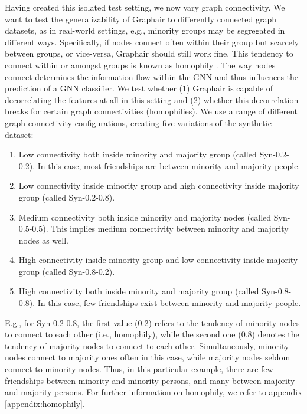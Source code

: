 Having created this isolated test setting, we now vary graph connectivity. We want to test the generalizability of Graphair to differently connected graph datasets, as in real-world settings, e.g., minority groups may be segregated in different ways.
Specifically, if nodes connect often within their group but scarcely between groups, or vice-versa, Graphair should still work fine. 
This tendency to connect within or amongst groups is known as homophily \citep{espin2022inequality}. 
The way nodes connect determines the information flow within the GNN and thus influences the prediction of a GNN classifier.
We test whether (1) Graphair is capable of decorrelating the features at all in this setting and (2) whether this decorrelation breaks for certain graph connectivities (homophilies).
We use a range of different graph connectivity configurations, creating five variations of the synthetic dataset:

\begin{enumerate}
    \item Low connectivity both inside minority and majority group (called Syn-0.2-0.2). In this case, most friendships are between minority and majority people.
    \item Low connectivity inside minority group and high connectivity inside majority group (called Syn-0.2-0.8).
    \item Medium connectivity both inside minority and majority nodes (called Syn-0.5-0.5). This implies medium connectivity between minority and majority nodes as well.
    \item High connectivity inside minority group and low connectivity inside majority group (called Syn-0.8-0.2).
    \item High connectivity both inside minority and majority group (called Syn-0.8-0.8). In this case, few friendships exist between minority and majority people.
\end{enumerate}

E.g., for Syn-0.2-0.8, the first value (0.2) refers to the tendency of minority nodes to connect to each other (i.e., homophily), while the second one (0.8) denotes the tendency of majority nodes to connect to each other. Simultaneously, minority nodes connect to majority ones often in this case, while majority nodes seldom connect to minority nodes. Thus, in this particular example, there are few friendships between minority and minority persons, and many between majority and majority persons. For further information on homophily, we refer to appendix \ref{appendix:homophily}.


